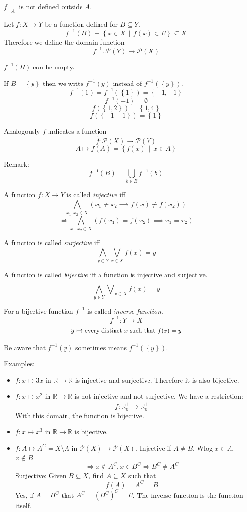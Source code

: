 \documentclass[a4paper,landscape,twocolumn]{article}
\newcommand\set[1]{\left\{#1\right\}}
\newcommand\setdef[2]{\left\{#1\,\middle|\,#2\right\}}
\begin{document}
$f\mid_A$ is not defined outside $A$.

Let $f: X \rightarrow Y$ be a function defined for $B \subseteq Y$.
\[ f^{-1}(B) = \setdef{x \in X}{f(x) \in B} \subseteq X \]
Therefore we define the domain function
\[ f^{-1}: \mathcal{P}(Y) \rightarrow \mathcal{P}(X) \]

$f^{-1}(B)$ can be empty.

If $B = \set{y}$ then we write $f^{-1}(y)$ instead of $f^{-1}(\set{y})$.
\[ f^{-1}(1) = f^{-1}(\set{1}) = \set{+1, -1} \]
\[ f^{-1}(-1) = \emptyset \]
\[ f(\set{1, 2}) = \set{1,4} \]
\[ f(\set{+1, -1}) = \set{1} \]

Analogously $f$ indicates a function
\[ \tilde f: \mathcal{P}(X) \rightarrow \mathcal{P}(Y) \]
\[ A \mapsto f(A) = \setdef{f(x)}{x \in A} \]

Remark:
\[ f^{-1}(B) = \bigcup_{b \in B} f^{-1}(b) \]

A function $f: X \rightarrow Y$ is called \emph{injective} iff
\[ \bigwedge_{x_1,x_2 \in X} (x_1 \neq x_2 \implies f(x) \neq f(x_2)) \]
\[ \iff \bigwedge_{x_1,x_2 \in X} (f(x_1) = f(x_2) \implies x_1 = x_2) \]

A function is called \emph{surjective} iff
\[ \bigwedge_{y \in Y} \bigvee_{x \in X} f(x) = y \]

A function is called \emph{bijective} iff a function is injective and surjective.
\[ \bigwedge_{y \in Y} \dot\bigvee_{x \in X} f(x) = y \]

For a bijective function $f^{-1}$ is called \emph{inverse function}.
\[ f^{-1}: Y \rightarrow X \]
\[ y \mapsto \text{\small every distinct $x$ such that $f(x) = y$} \]

Be aware that $f^{-1}(y)$ sometimes means $f^{-1}(\set{y})$.

Examples:
\begin{itemize}
  \item
    $f: x \mapsto 3x$ in $\mathbb{R} \rightarrow \mathbb{R}$ is injective and surjective.
    Therefore it is also bijective.
  \item
    $f: x \mapsto x^2$ in $\mathbb{R} \rightarrow \mathbb{R}$ is not injective and not surjective.
    We have a restriction:
    \[ \tilde f: \mathbb{R}_0^+ \rightarrow \mathbb{R}_0^+ \]
    With this domain, the function is bijective.
  \item
    $f: x \mapsto x^3$ in $\mathbb{R} \rightarrow \mathbb{R}$ is bijective.
  \item
    $f: A \mapsto A^C = X \setminus A$ in $\mathcal{P}(X) \rightarrow \mathcal{P}(X)$.
    Injective if $A \neq B$. Wlog $x \in A$, $x \not\in B$
    \[ \Rightarrow x \notin A^C, x \in B^C \Rightarrow B^C \neq A^C \]
    Surjective: Given $B \subseteq X$, find $A \subseteq X$ such that
    \[ f(A) = A^C = B \]
    Yes, if $A = B^C$ that $A^C = (B^C)^C = B$.
    The inverse function is the function itself.
\end{itemize}
\end{document}
